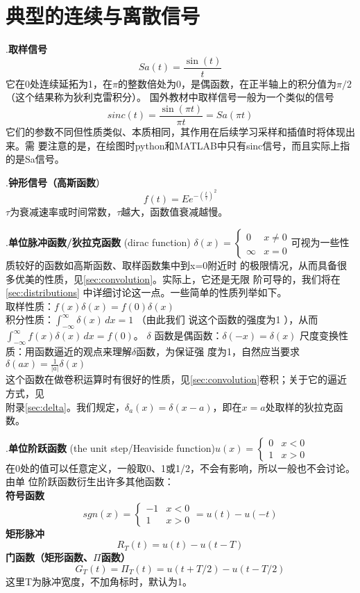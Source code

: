 \documentclass{ctexbook}
\begin{document}
\section{典型的连续与离散信号}
.\textbf{取样信号}\[Sa(t)=\frac{\sin(t)}{t}\]
它在0处连续延拓为1，在$\pi$的整数倍处为0，是偶函数，在正半轴上的积分值为$\pi /2$（这个结果称为狄利克雷积分）。
国外教材中取样信号一般为一个类似的信号\[sinc(t)=\frac{\sin(\pi t)}{\pi t}=Sa(\pi t)\]
它们的参数不同但性质类似、本质相同，其作用在后续学习采样和插值时将体现出来。需
要注意的是，在绘图时python和MATLAB中只有sinc信号，而且实际上指的是Sa信号。

.\textbf{钟形信号（高斯函数}）\[f(t)=Ee^{-{\left(\frac{t}{\tau }\right)}^2}\]
$\tau$为衰减速率或时间常数，$\tau$越大，函数值衰减越慢。

.\textbf{单位脉冲函数/狄拉克函数} (dirac function)
$\delta (x)=\begin{cases}
        0      & x\neq 0 \\
        \infty & x=0
    \end{cases}$可视为一些性质较好的函数如高斯函数、取样函数集中到x=0附近时
的极限情况，从而具备很多优美的性质，见\ref{sec:convolution}。实际上，它还是无限
阶可导的，我们将在\ref{sec:distributions}
中详细讨论这一点。一些简单的性质列举如下。\\
 取样性质：$f(x)\delta (x)=f(0)\delta (x)$\\
 积分性质：$\int_{-\infty}^{\infty}\delta (x)\,dx=1$ （由此我们
说这个函数的强度为1 ），从而
$\int_{-\infty}^{\infty}f(x)\delta (x)\,dx=f(0)$。
 $\delta$ 函数是偶函数：$\delta (-x)=\delta (x)$
 尺度变换性质：用函数逼近的观点来理解$\delta $函数，为保证强
度为1，自然应当要求$\delta (ax)=\frac{1}{|a|}\delta (x)$\\
这个函数在做卷积运算时有很好的性质，见\ref{sec:convolution}卷积；关于它的逼近方式，见\\
附录\ref{sec:delta}。我们规定，$\delta_a(x)=\delta (x-a)$，即在$x=a$处取样的狄拉克函数。

.\textbf{单位阶跃函数} (the unit step/Heaviside function)$u(x)=
    \begin{cases}
        0 & x<0 \\
        1 & x>0
    \end{cases}$\\
在0处的值可以任意定义，一般取0、1或1/2，不会有影响，所以一般也不会讨论。由单
位阶跃函数衍生出许多其他函数：\\
\textbf{符号函数}\[sgn(x)=\begin{cases}
        -1 & x<0 \\
        1  & x>0
    \end{cases}=u(t)-u(-t)\]
\textbf{矩形脉冲}\[R_T(t)=u(t)-u(t-T)\]
\textbf{门函数（矩形函数、$\Pi $函数）}\[G_T(t)=\Pi_T(t)=u(t+T/2)-u(t-T/2)\]
这里T为脉冲宽度，不加角标时，默认为1。
\end{document}
